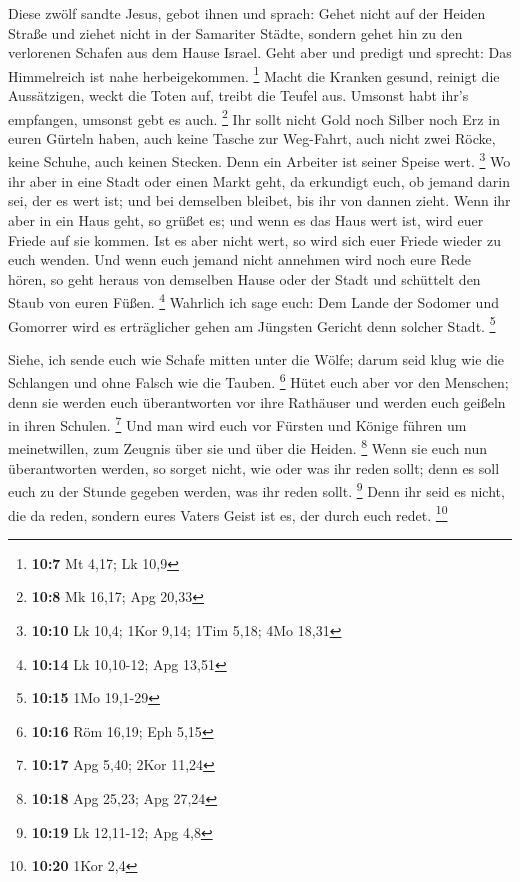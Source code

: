  Diese zwölf sandte Jesus, gebot ihnen und sprach: Gehet
nicht auf der Heiden Straße und ziehet nicht in der Samariter Städte,
 sondern gehet hin zu den verlorenen Schafen aus dem Hause
Israel.  Geht aber und predigt und sprecht: Das
Himmelreich ist nahe herbeigekommen. \footnote{\textbf{10:7} Mt 4,17; Lk
  10,9}  Macht die Kranken gesund, reinigt die
Aussätzigen, weckt die Toten auf, treibt die Teufel aus. Umsonst habt
ihr's empfangen, umsonst gebt es auch. \footnote{\textbf{10:8} Mk 16,17;
  Apg 20,33}  Ihr sollt nicht Gold noch Silber noch Erz in
euren Gürteln haben,  auch keine Tasche zur Weg-Fahrt,
auch nicht zwei Röcke, keine Schuhe, auch keinen Stecken. Denn ein
Arbeiter ist seiner Speise wert. \footnote{\textbf{10:10} Lk 10,4; 1Kor
  9,14; 1Tim 5,18; 4Mo 18,31}  Wo ihr aber in eine Stadt
oder einen Markt geht, da erkundigt euch, ob jemand darin sei, der es
wert ist; und bei demselben bleibet, bis ihr von dannen zieht.
 Wenn ihr aber in ein Haus geht, so grüßet es;
 und wenn es das Haus wert ist, wird euer Friede auf sie
kommen. Ist es aber nicht wert, so wird sich euer Friede wieder zu euch
wenden.  Und wenn euch jemand nicht annehmen wird noch
eure Rede hören, so geht heraus von demselben Hause oder der Stadt und
schüttelt den Staub von euren Füßen. \footnote{\textbf{10:14} Lk
  10,10-12; Apg 13,51}  Wahrlich ich sage euch: Dem Lande
der Sodomer und Gomorrer wird es erträglicher gehen am Jüngsten Gericht
denn solcher Stadt. \footnote{\textbf{10:15} 1Mo 19,1-29}

 Siehe, ich sende euch wie Schafe mitten unter die Wölfe;
darum seid klug wie die Schlangen und ohne Falsch wie die Tauben.
\footnote{\textbf{10:16} Röm 16,19; Eph 5,15}  Hütet euch
aber vor den Menschen; denn sie werden euch überantworten vor ihre
Rathäuser und werden euch geißeln in ihren Schulen. \footnote{\textbf{10:17}
  Apg 5,40; 2Kor 11,24}  Und man wird euch vor Fürsten
und Könige führen um meinetwillen, zum Zeugnis über sie und über die
Heiden. \footnote{\textbf{10:18} Apg 25,23; Apg 27,24} 
Wenn sie euch nun überantworten werden, so sorget nicht, wie oder was
ihr reden sollt; denn es soll euch zu der Stunde gegeben werden, was ihr
reden sollt. \footnote{\textbf{10:19} Lk 12,11-12; Apg 4,8}
 Denn ihr seid es nicht, die da reden, sondern eures
Vaters Geist ist es, der durch euch redet. \footnote{\textbf{10:20} 1Kor
  2,4}

